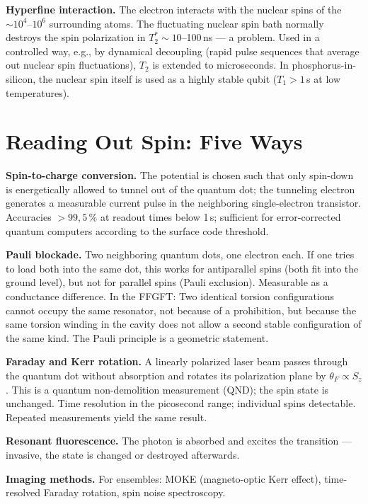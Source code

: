 \textbf{Hyperfine interaction.} The electron interacts with the
nuclear spins of the $\sim10^4$--$10^6$ surrounding atoms. The fluctuating
nuclear spin bath normally destroys the spin polarization in $T_2^*\sim
10$--100\,ns --- a problem. Used in a controlled way, e.g., by
dynamical decoupling (rapid pulse sequences that average out nuclear spin fluctuations), $T_2$ is extended to microseconds. In phosphorus-in-silicon,
the nuclear spin itself is used as a highly stable qubit
($T_1 > 1$\,s at low temperatures).

\section{Reading Out Spin: Five Ways}

\textbf{Spin-to-charge conversion.} The potential is chosen such
that only spin-down is energetically allowed to tunnel out of the quantum dot;
the tunneling electron generates a measurable current pulse in the
neighboring single-electron transistor. Accuracies $>99{,}5\,\%$ at
readout times below 1\,\textmu{}s; sufficient for error-corrected
quantum computers according to the surface code threshold.

\textbf{Pauli blockade.} Two neighboring quantum dots, one electron each.
If one tries to load both into the same dot, this works for
antiparallel spins (both fit into the ground level), but not for parallel
spins (Pauli exclusion). Measurable as a conductance difference. In the FFGFT: Two
identical torsion configurations cannot occupy the same resonator,
not because of a prohibition, but because the same torsion winding in
the cavity does not allow a second stable configuration of the same kind. The
Pauli principle is a geometric statement.

\textbf{Faraday and Kerr rotation.} A linearly
polarized laser beam passes through the quantum dot without absorption and rotates its
polarization plane by $\theta_F\propto S_z$. This is a
quantum non-demolition measurement (QND); the spin state is unchanged.
Time resolution in the picosecond range; individual spins detectable.
Repeated measurements yield the same result.

\textbf{Resonant fluorescence.} The photon is absorbed and excites the
transition --- invasive, the state is changed or destroyed afterwards.

\textbf{Imaging methods.} For ensembles: MOKE (magneto-optic
Kerr effect), time-resolved Faraday rotation, spin noise spectroscopy.


